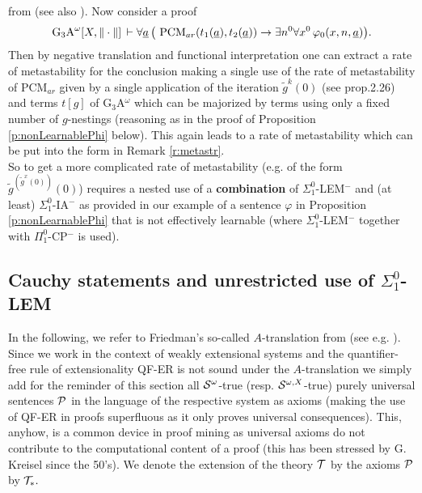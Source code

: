 from \cite{Kohlenbach(lowrate)} (see also \cite{Kohlenbach08}).
Now consider a proof 
\[\mbox{\rm G$_3$A}^{\omega}[X,\|\cdot\|]\,
\vdash   
\forall \underline{a}\, \big( 
\ \mbox{\rm PCM}_{ar}(t_1(\underline{a}),
t_2(\underline{a}))
 \rightarrow \exists n^0\forall x^0\,\varphi_0(x,n,\underline{a})\big).  \] 
Then by negative translation and functional interpretation one can 
extract a rate of metastability for the conclusion 
making a single use of the rate of 
metastability of PCM$_{ar}$ given by a single application of the iteration 
$\tilde{g}^{k}(0)$ (see \cite{Kohlenbach08} prop.2.26) 
and terms $t[g]$ of G$_3$A$^{\omega}$ which can be 
majorized by terms using only a fixed number of $g$-nestings (reasoning 
as in the proof of Proposition \ref{p:nonLearnablePhi} below). 
This again leads to a rate of 
metastability which can be put into the form in Remark \ref{r:metastr}.\\[1mm] 
So to get a more complicated rate of metastability (e.g. of the form 
$\tilde{g}^{(\tilde{g}^x(0))}(0)$) requires a nested use of a {\bf combination} of 
$\Sigma^0_1$-LEM$^-$ and (at least) 
$\Sigma^0_1$-IA$^-$ as provided in our example 
of a sentence $\varphi$ in Proposition 
\ref{p:nonLearnablePhi} that is not effectively learnable (where 
$\Sigma^0_1$-LEM$^-$ together with $\Pi^0_1$-CP$^-$ is used).

\subsection{Cauchy statements and unrestricted use of $\Sigma^0_1$-LEM}
In the following, we refer to Friedman's so-called $A$-translation from 
\cite{Friedman(78)} (see e.g. \cite{Kohlenbach08}). Since we 
work in the context of weakly extensional systems and the quantifier-free 
rule of extensionality QF-ER is not sound under the $A$-translation we simply 
add for the reminder of this section 
all ${\cal S}^{\omega}$-true (resp. ${\cal S}^{\omega,X}$-true) purely 
universal sentences ${\cal P}$ in the language of the respective system 
as axioms (making the use of QF-ER in proofs superfluous as it only proves 
universal consequences). This, anyhow, is a common device in proof mining 
as universal axioms do not contribute to the computational content of a 
proof (this has been stressed by G. Kreisel since the 50's). We denote 
the extension of the theory ${\cal T}$ by the axioms ${\cal P}$ by 
${\cal T}_*.$ 

